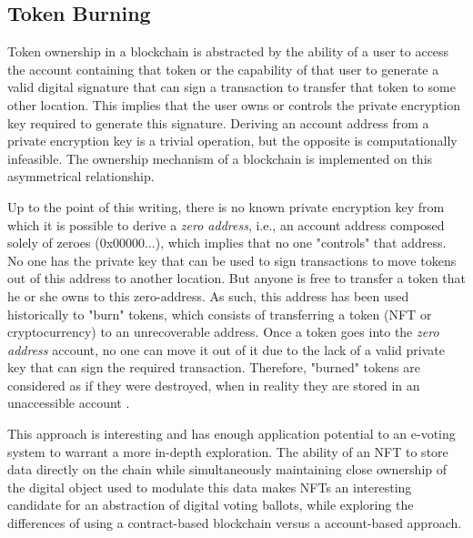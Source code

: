 \documentclass[../main.tex]{subfiles}
\begin{document}
\subsection{Token Burning}
Token ownership in a blockchain is abstracted by the ability of a user to access the account containing that token or the capability of that user to generate a valid digital signature that can sign a transaction to transfer that token to some other location. This implies that the user owns or controls the private encryption key required to generate this signature. Deriving an account address from a private encryption key is a trivial operation, but the opposite is computationally infeasible. The ownership mechanism of a blockchain is implemented on this asymmetrical relationship.
\par
Up to the point of this writing, there is no known private encryption key from which it is possible to derive a \textit{zero address}, i.e., an account address composed solely of zeroes (0x00000...), which implies that no one "controls" that address. No one has the private key that can be used to sign transactions to move tokens out of this address to another location. But anyone is free to transfer a token that he or she owns to this zero-address. As such, this address has been used historically to "burn" tokens, which consists of transferring a token (NFT or cryptocurrency) to an unrecoverable address. Once a token goes into the \textit{zero address} account, no one can move it out of it due to the lack of a valid private key that can sign the required transaction. Therefore, "burned" tokens are considered as if they were destroyed, when in reality they are stored in an unaccessible account \cite{Antonopoulos2018}.
\par
This approach is interesting and has enough application potential to an e-voting system to warrant a more in-depth exploration. The ability of an NFT to store data directly on the chain while simultaneously maintaining close ownership of the digital object used to modulate this data makes NFTs an interesting candidate for an abstraction of digital voting ballots, while exploring the differences of using a contract-based blockchain versus a account-based approach.
\end{document}
